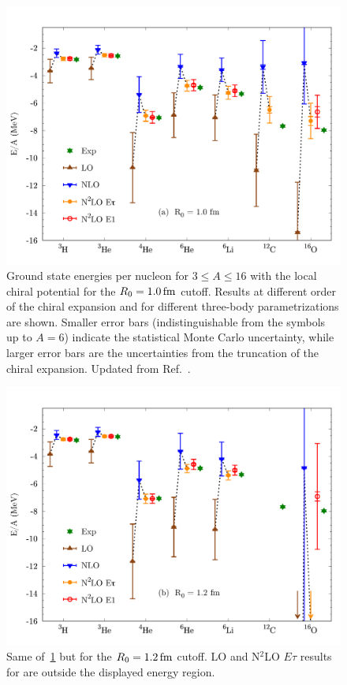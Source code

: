 \documentclass[aps,prc,twocolumn,superscriptaddress,floatfix]{revtex4-1}
\begin{document}
\begin{figure}[t]
\includegraphics[width=\linewidth]{ene_10.pdf}
\caption[]{Ground state energies per nucleon for $3\le A\le16$ with the local chiral potential 
for the $R_0=1.0\,\rm fm$ cutoff. Results at different order of the chiral expansion and for 
different three-body parametrizations are shown.
Smaller error bars (indistinguishable from the symbols up to $A=6$) 
indicate the statistical Monte Carlo uncertainty,
while larger error bars are the uncertainties from the truncation of
the chiral expansion. Updated from Ref.~\cite{Lonardoni:2017afdmc}.}
\label{fig:ene_10}
\end{figure}

\begin{figure}[t]
\includegraphics[width=\linewidth]{ene_12.pdf}
\caption[]{Same of~\cref{fig:ene_10} but for the $R_0=1.2\,\rm fm$ cutoff.
LO and N$^2$LO $E\tau$ results for  are outside the displayed energy region.}
\label{fig:ene_12}
\end{figure}
\end{document}
